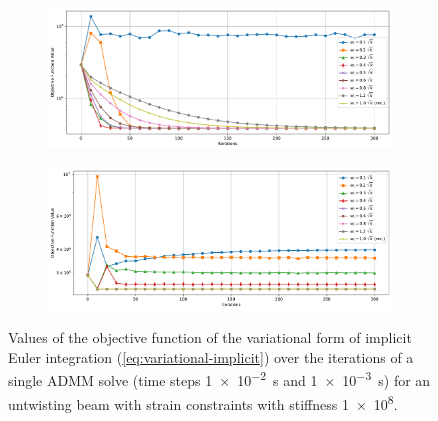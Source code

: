 \begin{figure}[h]
    \centering
    \begin{subfigure}{\textwidth}
        \includegraphics[width=\linewidth]{figures/strain_admm_weights_1e-2.pdf}
    \end{subfigure}
    \begin{subfigure}{\textwidth}
        \includegraphics[width=\linewidth]{figures/strain_admm_weights_1e-3.pdf}
    \end{subfigure}
    \caption{Values of the objective function of the variational form of implicit Euler integration (\cref{eq:variational-implicit}) over the iterations of a single 
    ADMM solve (time steps \SI{1e-2}{\second} and \SI{1e-3}{\second}) for an untwisting beam with strain constraints with stiffness \num{1e8}.}\label{fig:strain-weights-admm}
\end{figure}

